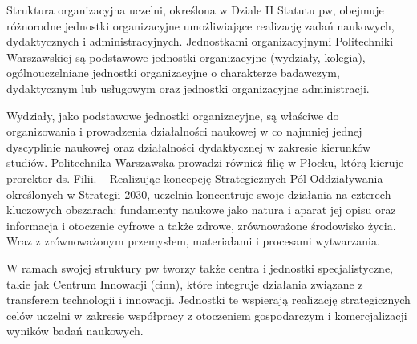 Struktura organizacyjna uczelni, określona w Dziale II Statutu \gls{pw}, obejmuje różnorodne jednostki organizacyjne umożliwiające realizację zadań naukowych, dydaktycznych i administracyjnych. Jednostkami organizacyjnymi Politechniki Warszawskiej są podstawowe jednostki organizacyjne (wydziały, kolegia), ogólnouczelniane jednostki organizacyjne o charakterze badawczym, dydaktycznym lub usługowym oraz jednostki organizacyjne administracji. ~\parencite[s. 16]{PW2030} 

Wydziały, jako podstawowe jednostki organizacyjne, są właściwe do organizowania i prowadzenia działalności naukowej w co najmniej jednej dyscyplinie naukowej oraz działalności dydaktycznej w zakresie kierunków studiów. Politechnika Warszawska prowadzi również filię w Płocku, którą kieruje prorektor ds. Filii. ~\parencite[s. 21]{PW2030} Realizując koncepcję Strategicznych Pól Oddziaływania określonych w Strategii 2030, uczelnia koncentruje swoje działania na czterech kluczowych obszarach: fundamenty naukowe jako natura i aparat jej opisu oraz informacja i otoczenie cyfrowe a także zdrowe, zrównoważone środowisko życia. Wraz z zrównoważonym przemysłem, materiałami i procesami wytwarzania.

W ramach swojej struktury \gls{pw} tworzy także centra i jednostki specjalistyczne, takie jak Centrum Innowacji (\gls{cinn}), które integruje działania związane z transferem technologii i innowacji. Jednostki te wspierają realizację strategicznych celów uczelni w zakresie współpracy z otoczeniem gospodarczym i komercjalizacji wyników badań naukowych.